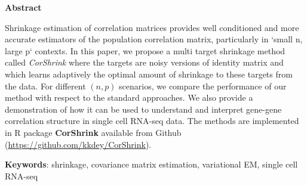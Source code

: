 \documentclass[a4paper, 12pt]{article}
\begin{document}
\begin{flushleft}
{\LARGE
\textbf{} 
}
\end{flushleft}

\begin{center}
\textbf{Abstract} \\ \vspace{0.2 in}
\end{center}
\begin{flushleft}
{\small Shrinkage estimation of correlation matrices provides well conditioned and more accurate estimators of the population correlation matrix, particularly in `small n, large p` contexts. In this paper, we propose a multi target shrinkage method called \textit{CorShrink} where the targets are noisy versions of identity matrix and which learns adaptively the optimal amount of shrinkage to these targets from the data. For different $(n,p)$ scenarios, we compare the performance of our method with respect to the standard approaches. We also provide a demonstration of how it can be used to understand  and interpret gene-gene correlation structure in single cell RNA-seq data. The methods are implemented in R package \textbf{CorShrink}  available from Github (\url{https://github.com/kkdey/CorShrink})}. \\ \vspace{0.2 in}

\textbf{Keywords}: shrinkage, covariance matrix estimation, variational EM, single cell RNA-seq
\end{flushleft}

\normalsize



\end{document}

